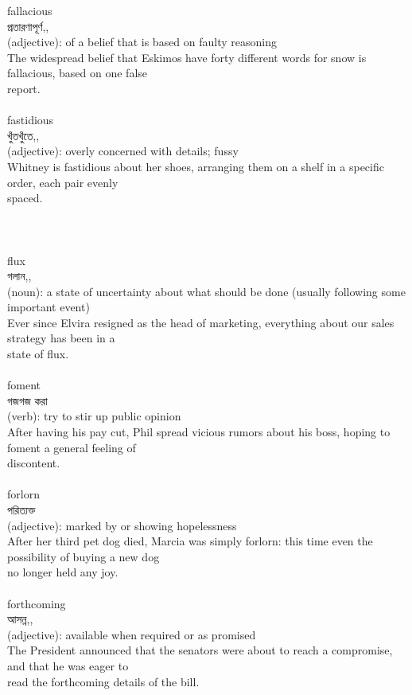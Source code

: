 \documentclass{article}
\begin{document}
{fallacious}\\
{প্রতারণাপূর্ণ,,}\\
{(adjective): of a belief that is based on faulty reasoning\\The widespread belief that Eskimos have forty different words for snow is fallacious, based on one false\\report.\\}\\
{fastidious}\\
{খুঁতখুঁতে,,}\\
{(adjective): overly concerned with details; fussy\\Whitney is fastidious about her shoes, arranging them on a shelf in a specific order, each pair evenly\\spaced.\\\\                                                                                \\}\\
{flux}\\
{গলান,,}\\
{(noun): a state of uncertainty about what should be done (usually following some important event)\\Ever since Elvira resigned as the head of marketing, everything about our sales strategy has been in a\\state of flux.\\}\\
{foment}\\
{গজগজ করা}\\
{(verb): try to stir up public opinion\\After having his pay cut, Phil spread vicious rumors about his boss, hoping to foment a general feeling of\\discontent.\\}\\
{forlorn}\\
{পরিত্যক্ত}\\
{(adjective): marked by or showing hopelessness\\After her third pet dog died, Marcia was simply forlorn: this time even the possibility of buying a new dog\\no longer held any joy.\\}\\
{forthcoming}\\
{আসন্ন,,}\\
{(adjective): available when required or as promised\\The President announced that the senators were about to reach a compromise, and that he was eager to\\read the forthcoming details of the bill.\\}\\
\end{document}

